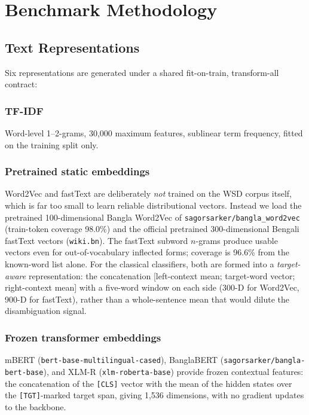 \documentclass[conference]{IEEEtran}
\begin{document}
\section{Benchmark Methodology}
\subsection{Text Representations}
Six representations are generated under a shared fit-on-train, transform-all contract:

\subsubsection{TF-IDF} Word-level 1--2-grams, 30,000 maximum features, sublinear term frequency, fitted on the training split only.

\subsubsection{Pretrained static embeddings} Word2Vec and fastText are deliberately \emph{not} trained on the WSD corpus itself, which is far too small to learn reliable distributional vectors. Instead we load the pretrained 100-dimensional Bangla Word2Vec of \texttt{sagorsarker/bangla\_word2vec} (train-token coverage 98.0\%) and the official pretrained 300-dimensional Bengali fastText vectors (\texttt{wiki.bn}). The fastText subword $n$-grams produce usable vectors even for out-of-vocabulary inflected forms; coverage is 96.6\% from the known-word list alone. For the classical classifiers, both are formed into a \emph{target-aware} representation: the concatenation [left-context mean; target-word vector; right-context mean] with a five-word window on each side (300-D for Word2Vec, 900-D for fastText), rather than a whole-sentence mean that would dilute the disambiguation signal.

\subsubsection{Frozen transformer embeddings} mBERT (\texttt{bert-base-multilingual-cased}), BanglaBERT (\texttt{sagorsarker/bangla-bert-base}), and XLM-R (\texttt{xlm-roberta-base}) provide frozen contextual features: the concatenation of the \texttt{[CLS]} vector with the mean of the hidden states over the \texttt{[TGT]}-marked target span, giving 1,536 dimensions, with no gradient updates to the backbone.
\end{document}
